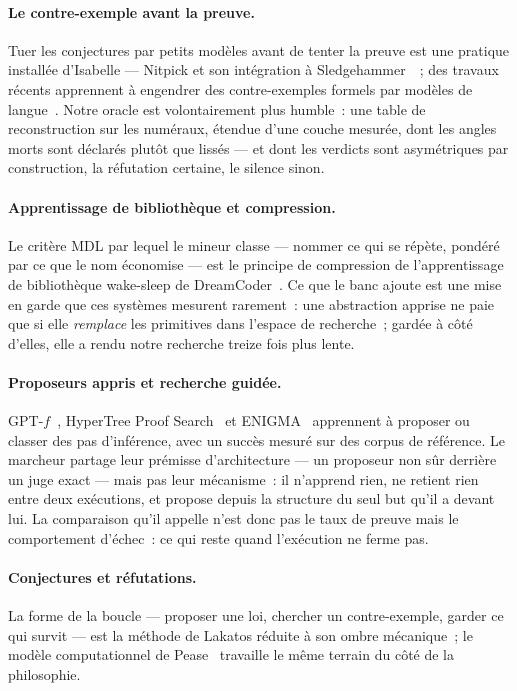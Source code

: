 \documentclass[11pt]{article}
\theoremstyle{remark}\newtheorem{remarque}{Remarque}
\begin{document}
\paragraph{Le contre-exemple avant la preuve.} Tuer les conjectures par
petits modèles avant de tenter la preuve est une pratique installée
d'Isabelle --- Nitpick et son intégration à
Sledgehammer~\cite{blanchette2011nitpick}~; des travaux récents apprennent à
engendrer des contre-exemples formels par modèles de
langue~\cite{learningtodisprove2026}. Notre oracle est volontairement plus
humble~: une table de reconstruction sur les numéraux, étendue d'une couche
mesurée, dont les angles morts sont déclarés plutôt que lissés --- et dont
les verdicts sont asymétriques par construction, la réfutation certaine, le
silence sinon.

\paragraph{Apprentissage de bibliothèque et compression.} Le critère MDL par
lequel le mineur classe --- nommer ce qui se répète, pondéré par ce que le
nom économise --- est le principe de compression de l'apprentissage de
bibliothèque wake-sleep de DreamCoder~\cite{ellis2021dreamcoder}. Ce que le
banc ajoute est une mise en garde que ces systèmes mesurent rarement~: une
abstraction apprise ne paie que si elle \emph{remplace} les primitives dans
l'espace de recherche~; gardée à côté d'elles, elle a rendu notre recherche
treize fois plus lente.

\paragraph{Proposeurs appris et recherche guidée.} GPT-$f$~\cite{polu2020gptf},
HyperTree Proof Search~\cite{lample2022htps} et
ENIGMA~\cite{jakubuv2020enigma} apprennent à proposer ou classer des pas
d'inférence, avec un succès mesuré sur des corpus de référence. Le marcheur
partage leur prémisse d'architecture --- un proposeur non sûr derrière un
juge exact --- mais pas leur mécanisme~: il n'apprend rien, ne retient rien
entre deux exécutions, et propose depuis la structure du seul but qu'il a
devant lui. La comparaison qu'il appelle n'est donc pas le taux de preuve
mais le comportement d'échec~: ce qui reste quand l'exécution ne ferme pas.

\paragraph{Conjectures et réfutations.} La forme de la boucle --- proposer
une loi, chercher un contre-exemple, garder ce qui survit --- est la méthode
de Lakatos réduite à son ombre mécanique~; le modèle computationnel de
Pease~\cite{pease2007lakatos} travaille le même terrain du côté de la
philosophie.
\end{document}
